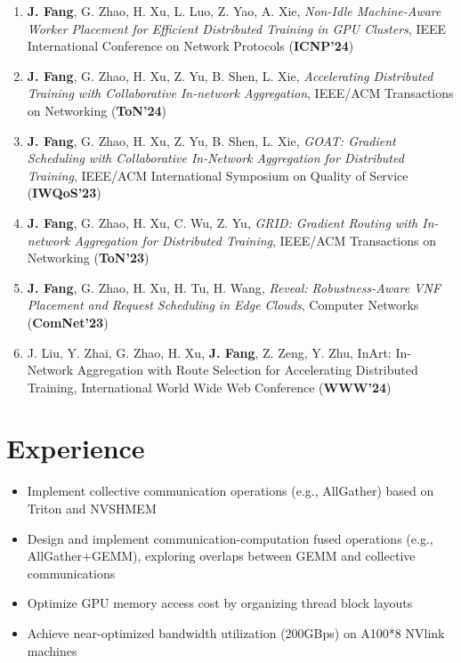 \documentclass{resume}
\begin{document}
\begin{enumerate}
  \item \textbf{J. Fang}, G. Zhao, H. Xu, L. Luo, Z. Yao, A. Xie, \textit{Non-Idle Machine-Aware Worker Placement for Efficient Distributed Training in GPU Clusters}, IEEE International Conference on Network Protocols (\textbf{ICNP'24})
  \item \textbf{J. Fang}, G. Zhao, H. Xu, Z. Yu, B. Shen, L. Xie, \textit{Accelerating Distributed Training with Collaborative In-network Aggregation}, IEEE/ACM Transactions on Networking (\textbf{ToN'24})
  \item \textbf{J. Fang}, G. Zhao, H. Xu, Z. Yu, B. Shen, L. Xie, \textit{GOAT: Gradient Scheduling with Collaborative In-Network Aggregation for Distributed Training}, IEEE/ACM International Symposium on Quality of Service (\textbf{IWQoS'23})
  \item \textbf{J. Fang}, G. Zhao, H. Xu, C. Wu, Z. Yu, \textit{GRID: Gradient Routing with In-network Aggregation for Distributed Training}, IEEE/ACM Transactions on Networking (\textbf{ToN'23})
  \item \textbf{J. Fang}, G. Zhao, H. Xu, H. Tu, H. Wang, \textit{Reveal: Robustness-Aware VNF Placement and Request Scheduling in Edge Clouds}, Computer Networks (\textbf{ComNet'23})
  \item J. Liu, Y. Zhai, G. Zhao, H. Xu, \textbf{J. Fang}, Z. Zeng, Y. Zhu, InArt: In-Network Aggregation with Route
  Selection for Accelerating Distributed Training, International World Wide Web Conference (\textbf{WWW'24})
\end{enumerate}

\section{Experience}

\begin{itemize}
  \item Implement collective communication operations (e.g., AllGather) based on Triton and NVSHMEM
  \item Design and implement communication-computation fused operations (e.g., AllGather+GEMM), exploring overlaps between GEMM and collective communications
  \item Optimize GPU memory access cost by organizing thread block layouts
  \item Achieve near-optimized bandwidth utilization (200GBps) on A100*8 NVlink machines
\end{itemize}
\end{document}

